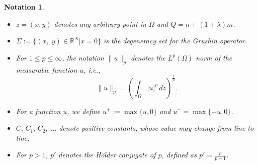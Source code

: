 \documentclass[12pt, notitlepage]{article}
\def\R{\mathbb{R}}
\newtheorem{notn}{Notation}[section]
\begin{document}
{\begin{notn}
\begin{itemize}
 \item $z=(x,y)$ denotes any arbitrary point in $\Omega$ and $Q=n+(1+\lambda)m$.

   \item  $\Sigma:=\{(x,\;y)\in\R^N|x=0\}$ is the degeneracy set for the Grushin operator.
    \item For $1\leq p\leq\infty$, the notation $\|u\|_p$ denotes the $L^p(\Omega)$ norm of the measurable function $u$, i.e.,$$\|u\|_p=\left (\int_\Omega |u|^p\, dz\right )^\frac{1}{p}.$$
    \item For a function $u$, we define $u^+:=\max{\{u,0\}}$ and $u^-=\max{\{-u, 0\}}$.
    \item $C,\, C_1,\, C_2,\;...$ denote positive constants, whose value may change from line to line.
    \item For $p>1$, $p'$ denotes the H\"{o}lder conjugate of $p$, defined as $p'=\frac{p}{p-1}$.
\end{itemize}
\end{notn}

}
\end{document}
